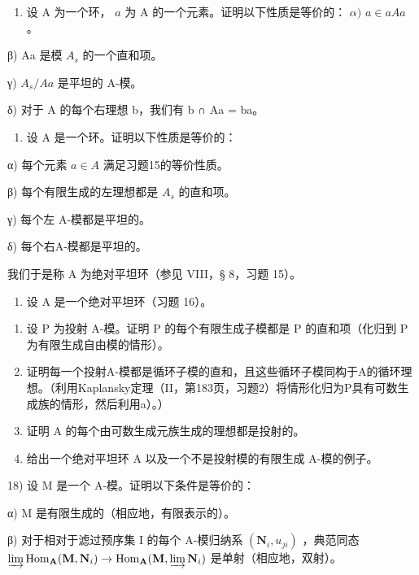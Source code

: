 \begin{enumerate}
\def\labelenumi{\arabic{enumi})}
\setcounter{enumi}{14}
\tightlist
\item
  设 A 为一个环， \(a\) 为 A 的一个元素。证明以下性质是等价的： \(\alpha)\) \(a\in aAa\) 。
\end{enumerate}

β) Aa 是模 \(A_{s}\) 的一个直和项。

γ) \(A_{s}/Aa\) 是平坦的 A-模。

δ) 对于 A 的每个右理想 b，我们有 b ∩ Aa = ba。

\begin{enumerate}
\def\labelenumi{\arabic{enumi})}
\setcounter{enumi}{15}
\tightlist
\item
  设 A 是一个环。证明以下性质是等价的：
\end{enumerate}

α) 每个元素 \(a \in A\) 满足习题15的等价性质。

β) 每个有限生成的左理想都是 \(A_{s}\) 的直和项。

γ) 每个左 A-模都是平坦的。

δ) 每个右A-模都是平坦的。

我们于是称 A 为绝对平坦环（参见 VIII，§ 8，习题 15）。

\begin{enumerate}
\def\labelenumi{\arabic{enumi})}
\setcounter{enumi}{16}
\tightlist
\item
  设 A 是一个绝对平坦环（习题 16）。
\end{enumerate}

\begin{enumerate}
\def\labelenumi{\alph{enumi})}
\item
  设 P 为投射 A-模。证明 P 的每个有限生成子模都是 P 的直和项（化归到 P 为有限生成自由模的情形）。
\item
  证明每一个投射A-模都是循环子模的直和，且这些循环子模同构于A的循环理想。（利用Kaplansky定理（II，第183页，习题2）将情形化归为P具有可数生成族的情形，然后利用a）。）
\item
  证明 A 的每个由可数生成元族生成的理想都是投射的。
\item
  给出一个绝对平坦环 A 以及一个不是投射模的有限生成 A-模的例子。
\end{enumerate}

18) 设 M 是一个 A-模。证明以下条件是等价的：

α) M 是有限生成的（相应地，有限表示的）。

β) 对于相对于滤过预序集 I 的每个 A-模归纳系 \((\mathbf{N}_{i}, u_{ji})\) ，典范同态 \(\varinjlim\operatorname{Hom}_{\mathbf{A}}(\mathbf{M}, \mathbf{N}_{i}) \to \operatorname{Hom}_{\mathbf{A}}(\mathbf{M}, \varinjlim \mathbf{N}_{i})\) 是单射（相应地，双射）。

